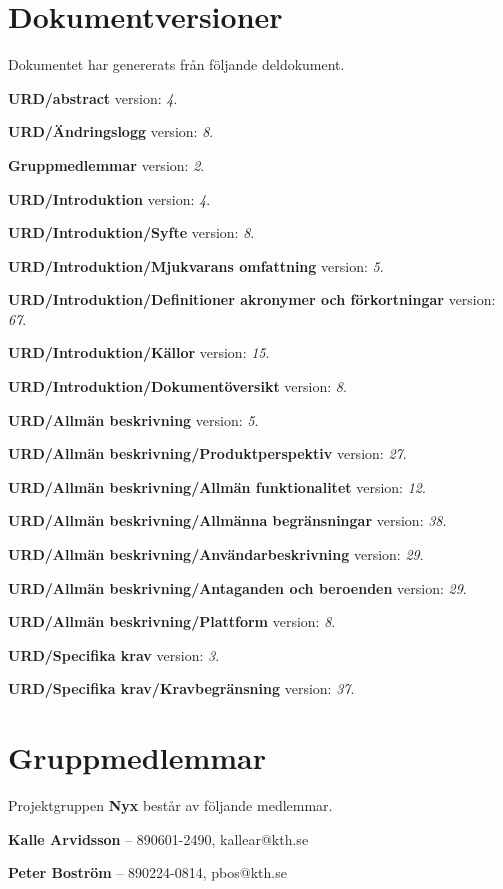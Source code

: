 \documentclass[a4paper, twoside, 11pt, titlepage]{article}
\begin{document}
\clearpage
\section*{Dokumentversioner}


Dokumentet har genererats från följande deldokument.

\textbf{URD/abstract} version: \emph{4}.

\textbf{URD/Ändringslogg} version: \emph{8}.

\textbf{Gruppmedlemmar} version: \emph{2}.

\textbf{URD/Introduktion} version: \emph{4}.

\textbf{URD/Introduktion/Syfte} version: \emph{8}.

\textbf{URD/Introduktion/Mjukvarans omfattning} version: \emph{5}.

\textbf{URD/Introduktion/Definitioner akronymer och förkortningar} version: \emph{67}.

\textbf{URD/Introduktion/Källor} version: \emph{15}.

\textbf{URD/Introduktion/Dokumentöversikt} version: \emph{8}.

\textbf{URD/Allmän beskrivning} version: \emph{5}.

\textbf{URD/Allmän beskrivning/Produktperspektiv} version: \emph{27}.

\textbf{URD/Allmän beskrivning/Allmän funktionalitet} version: \emph{12}.

\textbf{URD/Allmän beskrivning/Allmänna begränsningar} version: \emph{38}.

\textbf{URD/Allmän beskrivning/Användarbeskrivning} version: \emph{29}.

\textbf{URD/Allmän beskrivning/Antaganden och beroenden} version: \emph{29}.

\textbf{URD/Allmän beskrivning/Plattform} version: \emph{8}.

\textbf{URD/Specifika krav} version: \emph{3}.

\textbf{URD/Specifika krav/Kravbegränsning} version: \emph{37}.

\clearpage
\section{Gruppmedlemmar}


Projektgruppen \textbf{Nyx} består av följande medlemmar.

\textbf{Kalle Arvidsson} -- 890601-2490, kallear@kth.se

\textbf{Peter Boström} -- 890224-0814, pbos@kth.se
\end{document}
